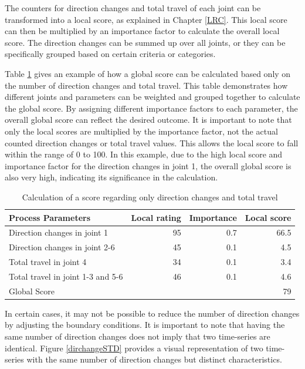 The counters for direction changes and total travel of each joint can be transformed into a local score, as explained in Chapter \ref{LRC}. This local score can then be multiplied by an importance factor to calculate the overall local score. The direction changes can be summed up over all joints, or they can be specifically grouped based on certain criteria or categories.  

Table \ref{exampleDirTravel} gives an example of how a global score can be calculated based only on the number of direction changes and total travel. This table demonstrates how different joints and parameters can be weighted and grouped together to calculate the global score. By assigning different importance factors to each parameter, the overall global score can reflect the desired outcome. It is important to note that only the local scores are multiplied by the importance factor, not the actual counted direction changes or total travel values. This allows the local score to fall within the range of 0 to 100. In this example, due to the high local score and importance factor for the direction changes in joint 1, the overall global score is also very high, indicating its significance in the calculation.


\begin{table}[H]
	\centering
	\begin{tabular}{||l|r|r|r||}
		Process Parameters & Local rating & Importance & Local score\\
		\hline
		\hline
		\hline
		
		Direction changes in joint 1 & 95 & 0.7 & 66.5\\
		Direction changes in joint 2-6 & 45& 0.1&4.5\\
		Total travel in joint 4& 34& 0.1&3.4\\
		Total travel in joint 1-3 and 5-6& 46&0.1&4.6\\
		\hline
		\hline
		\hline
		Global Score& & &79\\
		\hline
		\hline
	\end{tabular}
	
	\caption{Calculation of a score regarding only direction changes and total travel}
	\label{exampleDirTravel}
\end{table}

In certain cases, it may not be possible to reduce the number of direction changes by adjusting the boundary conditions. It is important to note that having the same number of direction changes does not imply that two time-series are identical. Figure \ref{dirchangeSTD} provides a visual representation of two time-series with the same number of direction changes but distinct characteristics.

